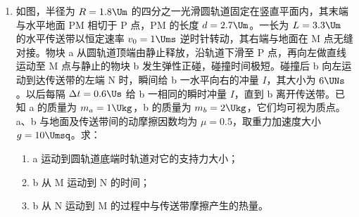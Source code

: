 \documentclass[\gkver]{gaokaozhenti}
\begin{document}
\begin{enumerate}
\item
如图，半径为 $R = 1.8 \Um$ 的四分之一光滑圆轨道固定在竖直平面内，其末端与水平地面 PM 相切于 P 点，PM 的长度 $d = 2.7 \Um$。一长为 $L = 3.3 \Um$ 的水平传送带以恒定速率 $v_{0} = 1 \Ums$ 逆时针转动，其右端与地面在 M 点无缝对接。物块 a 从圆轨道顶端由静止释放，沿轨道下滑至 P 点，再向左做直线运动至 M 点与静止的物块 b 发生弹性正碰，碰撞时间极短。碰撞后 b 向左运动到达传送带的左端 N 时，瞬间给 b 一水平向右的冲量 $I$，其大小为 $6 \UNs$。以后每隔 $\Delta t = 0.6 \Us$ 给 b 一相同的瞬时冲量 $I$，直到 b 离开传送带。已知 a 的质量为 $m_{a} = 1 \Ukg$，b 的质量为 $m_{b} = 2 \Ukg$，它们均可视为质点。a、b 与地面及传送带间的动摩擦因数均为 $\mu = 0.5$，取重力加速度大小 $g = 10 \Umsq$。求：
\begin{enumerate}
	\item
	a 运动到圆轨道底端时轨道对它的支持力大小；
	\item
	b 从 M 运动到 N 的时间；
	\item
	b 从 N 运动到 M 的过程中与传送带摩擦产生的热量。
\end{enumerate}

\jdanswer{
\begin{enumerate}
	\item
	$30 \UN$

	\item
	$3.2 \Us$

	\item
	$95 \UJ$

\end{enumerate}
}
\end{enumerate}
\end{document}
